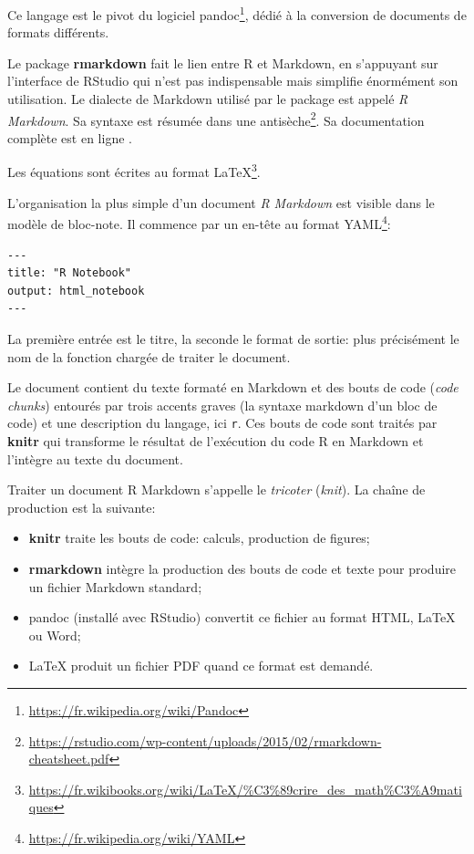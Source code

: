 \documentclass[
  12pt,
  french,
  a4paper,
  extrafontsizes,onecolumn,openright
  ]{memoir}
\providecommand{\tightlist}{%
  \setlength{\itemsep}{0pt}\setlength{\parskip}{0pt}}
\newlength{\rf}
\begin{document}
Ce langage est le pivot du logiciel pandoc\footnote{\url{https://fr.wikipedia.org/wiki/Pandoc}}, dédié à la conversion de documents de formats différents.

Le package \textbf{rmarkdown} \autocite{Xie2015} fait le lien entre R et Markdown, en s'appuyant sur l'interface de RStudio qui n'est pas indispensable mais simplifie énormément son utilisation.
Le dialecte de Markdown utilisé par le package est appelé \emph{R Markdown}.
Sa syntaxe est résumée dans une antisèche\footnote{\url{https://rstudio.com/wp-content/uploads/2015/02/rmarkdown-cheatsheet.pdf}}.
Sa documentation complète est en ligne \autocite{Xie2018}.

Les équations sont écrites au format LaTeX\footnote{\url{https://fr.wikibooks.org/wiki/LaTeX/\%C3\%89crire_des_math\%C3\%A9matiques}}.

L'organisation la plus simple d'un document \emph{R Markdown} est visible dans le modèle de bloc-note.
Il commence par un en-tête au format YAML\footnote{\url{https://fr.wikipedia.org/wiki/YAML}}:

\begin{verbatim}
---
title: "R Notebook"
output: html_notebook
---
\end{verbatim}

La première entrée est le titre, la seconde le format de sortie: plus précisément le nom de la fonction chargée de traiter le document.

Le document contient du texte formaté en Markdown et des bouts de code (\emph{code chunks}) entourés par trois accents graves (la syntaxe markdown d'un bloc de code) et une description du langage, ici \texttt{r}.
Ces bouts de code sont traités par \textbf{knitr} qui transforme le résultat de l'exécution du code R en Markdown et l'intègre au texte du document.

Traiter un document R Markdown s'appelle le \emph{tricoter} (\emph{knit}).
La chaîne de production est la suivante:

\begin{itemize}
\tightlist
\item
  \textbf{knitr} traite les bouts de code: calculs, production de figures;
\item
  \textbf{rmarkdown} intègre la production des bouts de code et texte pour produire un fichier Markdown standard;
\item
  pandoc (installé avec RStudio) convertit ce fichier au format HTML, LaTeX ou Word;
\item
  LaTeX produit un fichier PDF quand ce format est demandé.
\end{itemize}
\end{document}
